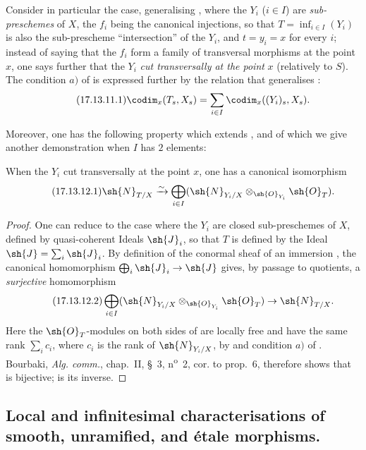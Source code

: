\begin{env}[17.13.11]
\label{IV.17.13.11}
Consider in particular the case, generalising , where the $Y_i$ ($i\in I$) are \emph{sub-preschemes} of $X$, the $f_i$ being the canonical injections, so that $T=\inf_{i\in I}(Y_i)$ is also the sub-prescheme ``intersection'' of the $Y_i$, and $t=y_i=x$ for every $i$; instead of saying that the $f_i$ form a family of transversal morphisms at the point $x$, one says further that the $Y_i$ \emph{cut transversally at the point} $x$ (relatively to $S$).
The condition $a)$ of  is expressed further by the relation that generalises :
\[
\label{IV.17.13.11.1}
\tag{17.13.11.1}
\codim_x(T_s,X_s) = \sum_{i\in I}\codim_x((Y_i)_s,X_s).
\]

Moreover, one has the following property which extends , and of which we give another demonstration when $I$ has $2$ elements:
\end{env}

\begin{corollary}[17.13.12]
\label{IV.17.13.12}
When the $Y_i$ cut transversally at the point $x$, one has a canonical isomorphism
\[
\label{IV.17.13.12.1}
\tag{17.13.12.1}
\sh{N}_{T/X} \xrightarrow{\sim} \bigoplus_{i\in I}(\sh{N}_{Y_i/X}\otimes_{\sh{O}_{Y_i}}\sh{O}_T).
\]
\end{corollary}

\begin{proof}
One can reduce to the case where the $Y_i$ are closed sub-preschemes of $X$, defined by quasi-coherent Ideals $\sh{J}_i$, so that $T$ is defined by the Ideal $\sh{J}=\sum_i\sh{J}_i$.
By definition of the conormal sheaf of an immersion , the canonical homomorphism $\bigoplus_i\sh{J}_i\to\sh{J}$ gives, by passage to quotients, a \emph{surjective} homomorphism
\[
\label{IV.17.13.12.2}
\tag{17.13.12.2}
\bigoplus_{i\in I}(\sh{N}_{Y_i/X}\otimes_{\sh{O}_{Y_i}}\sh{O}_T) \to \sh{N}_{T/X}.
\]
Here the $\sh{O}_T$-modules on both sides of  are locally free and have the same rank $\sum_i c_i$, where $c_i$ is the rank of $\sh{N}_{Y_i/X}$, by  and condition $a)$ of .
Bourbaki, \emph{Alg. comm.}, chap.~II, \S~3, n\textsuperscript{o}~2, cor. to prop.~6, therefore shows that  is bijective;  is its inverse.
\end{proof}

\subsection{Local and infinitesimal characterisations of smooth, unramified, and \'etale morphisms.}
\label{subsection:IV.17.14}

